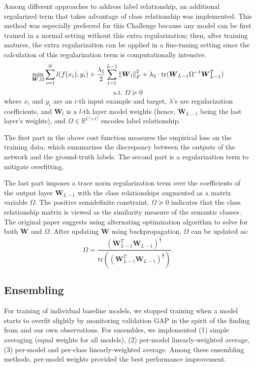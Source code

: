 \documentclass[runningheads]{llncs}
\newcommand\norm[1]{\left\lVert#1\right\rVert}
\begin{document}
Among different approaches to address label relationship, an additional regularized term that takes advantage of class relationship \cite{jiang2018} was implemented.
This method was especially preferred for this Challenge because any model can be first trained in a normal setting without this extra regularization; then, after training matures, the extra regularization can be applied in a fine-tuning setting since the calculation of this regularization term is computationally intensive.
\begin{equation}
        \min_{\boldsymbol{W}, \Omega} \sum_{i=1}^{N} l(f(x_i), y_i) + \frac{\lambda_1}{2} \sum_{l=1}^{L-1} \norm{ \boldsymbol{W}_l }_F^2 + \lambda_2 \cdot \textrm{tr}( \boldsymbol{W}_{L-1} \Omega^{-1} \boldsymbol{W}_{L-1}^T) \\
\end{equation}
\[
        \textrm{s.t. } \Omega \succeq 0
\]
where $x_i$ and $y_i$ are an $i$-th input example and target, $\lambda$'s are regularization coefficients, and $\boldsymbol{W}_l$ is a $l$-th layer model weights (hence, $\boldsymbol{W}_{L-1}$ being the last layer's weights), and $\Omega \in \mathbb{R}^{C \times C}$ encodes label relationship.

The first part in the above cost function measures the empirical loss on the training data, which summarizes the discrepancy between the outputs of the network and the ground-truth labels.
The second part is a regularization term to mitigate overfitting.

The last part imposes a trace norm regularization term over the coefficients of the output layer $\boldsymbol{W}_{L-1}$ with the class relationships augmented as a matrix variable $\Omega$.
The positive semidefinite constraint, $\Omega \succeq 0$ indicates that the class relationship matrix is viewed as the similarity measure of the semantic classes.
The original paper \cite{jiang2018} suggests using alternating optimization algorithm to solve for both $\boldsymbol{W}$ and $\Omega$. After updating $\boldsymbol{W}$ using backpropagation, $\Omega$ can be updated as:
\begin{equation}
        \Omega = \frac
        { ( \boldsymbol{W}_{L-1}^T \boldsymbol{W}_{L-1} )^\frac{1}{2}  }
        { \textrm{tr} (( \boldsymbol{W}_{L-1}^T \boldsymbol{W}_{L-1} )^\frac{1}{2} )  }.
\end{equation}

\subsection{Ensembling} \label{sub:ensemble}
For training of individual baseline models, we stopped training when a model starts to overfit slightly by monitoring validation GAP in the spirit of the finding from \cite{bober2017} and our own observations.
For ensembles, we implemented (1) simple averaging (equal weights for all models), (2) per-model linearly-weighted average, (3) per-model and per-class linearly-weighted average.
Among these ensembling methods, per-model weights provided the best performance improvement.
\end{document}
